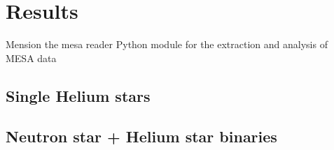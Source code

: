 \documentclass[../../main/thesis_msc.tex]{subfiles}
\begin{document}
	\chapter{Results}
	
		Mension the mesa reader Python module for the extraction and analysis of MESA data
		
			\section{Single Helium stars}
			
			
			
			\section{Neutron star + Helium star binaries}
\end{document}
